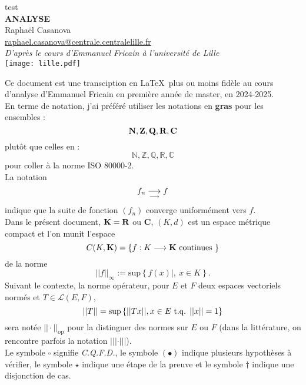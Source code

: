\documentclass[a4paper,11pt, twoside]{article}
\title{}
\author{Raphaël Casanova}
\begin{document}
\pagestyle{empty}
\begin{center}
{\color{white} test}\\
\vspace{5cm}
{\bf \Huge {\YUGE A}NALYSE}\\[1em]
Raphaël Casanova\\
\href{mailto:raphael.casanova@centrale.centralelille.fr}{raphael.casanova@centrale.centralelille.fr}\\[2em]
\emph{D'après le cours d'Emmanuel Fricain à l'université de Lille}\\
\vspace{10cm}
\texttt{[image: lille.pdf]}
\end{center}


\newpage


\pagestyle{pageGarde}


\tableofcontents


\newpage


Ce document est une transciption en \LaTeX\ plus ou moins fidèle au cours d'analyse d'Emmanuel Fricain en première année de master, en 2024-2025.\\
En terme de notation, j'ai préféré utiliser les notations en {\bf gras} pour les ensembles : 
$$\mathbf N,\mathbf Z,\mathbf Q,\mathbf R,\mathbf C$$ plutôt que celles en : $$\mathbb N,\mathbb Z, \mathbb Q,\mathbb R,\mathbb C$$ pour coller à la norme ISO 80000-2.\\
La notation 
$$f_n\underset{\longrightarrow}{\longrightarrow} f$$
indique que la suite de fonction $\left(f_n\right)$ converge uniformément vers $f$.\\
Dans le présent document, $\mathbf K=\mathbf R$ ou $\mathbf C$, $(K,d)$ est un espace métrique compact et l'on munit l'espace 
$$C(K,\mathbf K)=\left\{f:K\longrightarrow\mathbf K\text{ continues }\right\}$$
de la norme 
$$||f||_{\infty}:=\mathrm{sup}\left\{f(x)|,\ x\in K\right\}.$$
Suivant le contexte, la norme opérateur, pour $E$ et $F$ deux espaces vectoriels normés et $T\in\mathcal L(E,F)$,
$$||T||=\mathrm{sup}\left\{||T x||, x\in E\text{ t.q. }||x||=1\right\}$$
sera notée $||\cdot||_{\mathrm{op}}$ pour la distinguer des normes sur $E$ ou $F$ (dans la littérature, on rencontre parfois la notation $|||\cdot|||$).\\

Le symbole $\square$ signifie \emph{C.Q.F.D.}, le symbole $(\bullet)$ indique plusieurs hypothèses à vérifier, le symbole $\star$ indique une étape de la preuve et le symbole $\dagger$ indique une disjonction de cas.
\end{document}
